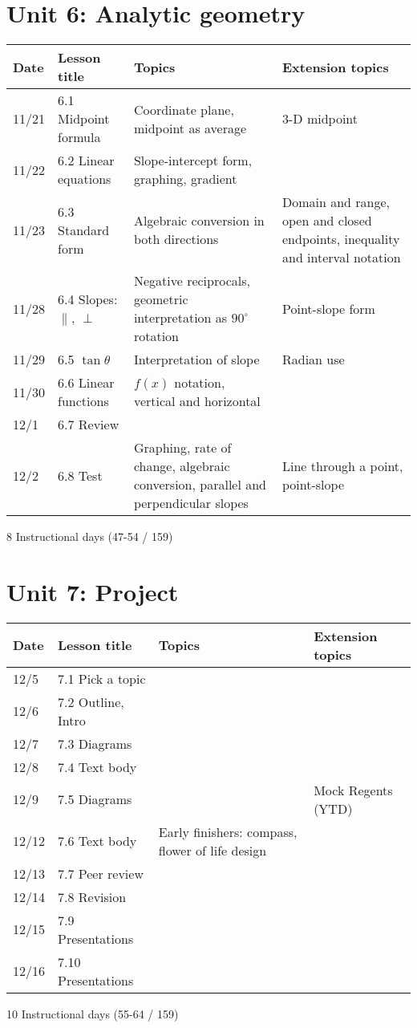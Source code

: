 \section*{Unit 6: Analytic geometry}
\begin{tabular}{|p{0.9cm}|p{4cm}|p{7cm}|p{5cm}|}
  \hline
  Date & Lesson title & Topics  & Extension topics \\
  \hline
  11/21 & 6.1 Midpoint formula & Coordinate plane, midpoint as average & 3-D midpoint \\
  \hline
  11/22 & 6.2 Linear equations & Slope-intercept form, graphing, gradient &  \\
  \hline
  11/23 & 6.3 Standard form & Algebraic conversion in both directions & Domain and range, open and closed endpoints, inequality and interval notation \\
  \hline
  11/28 & 6.4 Slopes: $\parallel$, $\perp$ & Negative reciprocals, geometric interpretation as $90^\circ$ rotation & Point-slope form \\
  \hline
  11/29 & 6.5 $\tan \theta$ & Interpretation of slope & Radian use \\
  \hline
  11/30 & 6.6 Linear functions & $f(x)$ notation, vertical and horizontal & \\
  \hline
  12/1 & 6.7 Review &  &  \\
  \hline
  12/2 & 6.8 Test & Graphing, rate of change, algebraic conversion, parallel and perpendicular slopes & Line through a point, point-slope \\
  \hline

\end{tabular} \par \vspace*{0.3cm}
8 Instructional days (47-54 / 159)


\section*{Unit 7: Project}
\begin{tabular}{|p{0.9cm}|p{4cm}|p{7cm}|p{5cm}|}
  \hline
  Date & Lesson title & Topics  & Extension topics \\
  \hline
  12/5 & 7.1 Pick a topic &  &  \\
  \hline
  12/6 & 7.2 Outline, Intro &  &  \\
  \hline
  12/7 & 7.3 Diagrams &  &  \\
  \hline
  12/8 & 7.4 Text body &  &  \\
  \hline
  12/9 & 7.5 Diagrams &  & Mock Regents (YTD) \\
  \hline
  12/12 & 7.6 Text body & Early finishers: compass, flower of life design &  \\
  \hline
  12/13 & 7.7 Peer review &  &  \\
  \hline
  12/14 & 7.8 Revision &  & \\
  \hline
  12/15 & 7.9 Presentations &  &  \\
  \hline
  12/16 & 7.10 Presentations &  & \\
  \hline

\end{tabular} \par \vspace*{0.3cm}
10 Instructional days (55-64 / 159)


